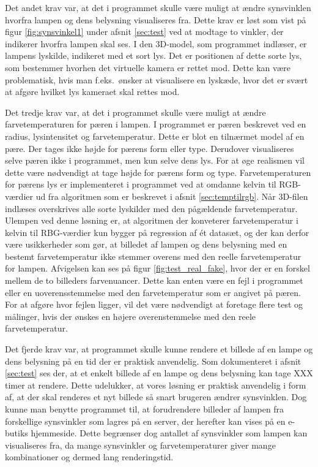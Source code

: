 Det andet krav var, at det i programmet skulle være muligt at ændre synsvinklen hvorfra lampen og dens belysning visualiseres fra. Dette krav er løst som vist på figur \ref{fig:synsvinkel1} under afsnit \ref{sec:test} ved at modtage to vinkler, der indikerer hvorfra lampen skal ses. I den 3D-model, som programmet indlæser, er lampens lyskilde, indikeret med et sort lys. Det er positionen af dette sorte lys, som bestemmer hvorhen det virtuelle kamera er rettet mod. Dette kan være problematisk, hvis man f.eks.\ ønsker at visualisere en lyskæde, hvor det er svært at afgøre hvilket lys kameraet skal rettes mod. 

Det tredje krav var, at det i programmet skulle være muligt at ændre farvetemperaturen for pæren i lampen. I programmet er pæren beskrevet ved en radius, lysintensitet og farvetemperatur. Dette er blot en tilnærmet model af en pære. Der tages ikke højde for pærens form eller type. Derudover visualiseres selve pæren ikke i programmet, men kun selve dens lys. For at øge realismen vil dette være nødvendigt at tage højde for pærens form og type.
Farvetemperaturen for pærens lys er implementeret i programmet ved at omdanne kelvin til RGB-værdier ud fra algoritmen som er beskrevet i afsnit \ref{sec:temptilrgb}. Når 3D-filen indlæses overskrives alle sorte lyskilder med den pågældende farvetemperatur. Ulempen ved denne løsning er, at algoritmen der konveterer farvetemperatur i kelvin til RBG-værdier kun bygger på regression af ét datasæt, og der kan derfor være usikkerheder som gør, at billedet af lampen og dens belysning med en bestemt farvetemperatur ikke stemmer overens med den reelle farvetemperatur for lampen. Afvigelsen kan ses på figur \ref{fig:test_real_fake}, hvor der er en forskel mellem de to billeders farvenuancer. Dette kan enten være en fejl i programmet eller en uoverensstemmelse med den farvetemperatur som er angivet på pæren. For at afgøre hvor fejlen ligger, vil det være nødvendigt at foretage flere test og målinger, hvis der ønskes en højere overenstemmelse med den reele farvetemperatur.

Det fjerde krav var, at programmet skulle kunne rendere et billede af en lampe og dens belysning på en tid der er praktisk anvendelig. Som dokumenteret i afsnit \ref{sec:test} ses der, at et enkelt billede af en lampe og dens belysning kan tage XXX timer at rendere. Dette udelukker, at vores løsning er praktisk anvendelig i form af, at der skal renderes et nyt billede så snart brugeren ændrer synsvinklen. Dog kunne man benytte programmet til, at forudrendere billeder af lampen fra forskellige synsvinkler som lagres på en server, der herefter kan vises på en e-butiks hjemmeside. Dette begrænser dog antallet af synsvinkler som lampen kan visualiseres fra, da mange synsvinkler og farvetemperaturer giver mange kombinationer og dermed lang renderingstid. 

